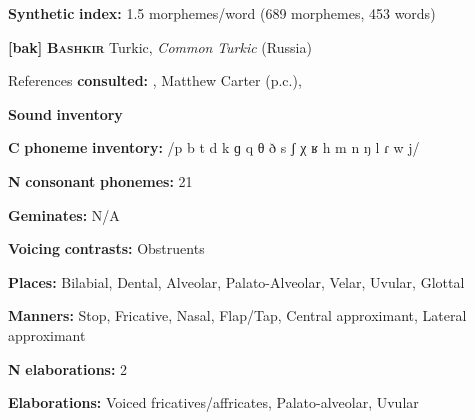 \documentclass[output=paper]{langsci/langscibook}
\begin{document}
\begin{styleBody}
\textbf{Synthetic} \textbf{index:} 1.5 morphemes/word (689 morphemes, 453 words)
\end{styleBody}

\begin{styleBody}
\textbf{[bak]}   \textbf{\textsc{Bashkir}}  Turkic, \textit{Common} \textit{Turkic} (Russia)
\end{styleBody}

\begin{styleBody}
References \textbf{consulted:} \citet{BerksonEtAl2016}, Matthew Carter (p.c.), \citet{Poppe1964}
\end{styleBody}

\begin{styleBody}
\textbf{Sound} \textbf{inventory}
\end{styleBody}

\begin{styleBody}
\textbf{C} \textbf{phoneme} \textbf{inventory:} /p b t d k ɡ q θ ð s ʃ χ ʁ h m n ŋ l ɾ w j/
\end{styleBody}

\begin{styleBody}
\textbf{N} \textbf{consonant} \textbf{phonemes:} 21
\end{styleBody}

\begin{styleBody}
\textbf{Geminates:} N/A
\end{styleBody}

\begin{styleBody}
\textbf{Voicing} \textbf{contrasts:} Obstruents
\end{styleBody}

\begin{styleBody}
\textbf{Places:} Bilabial, Dental, Alveolar, Palato-Alveolar, Velar, Uvular, Glottal
\end{styleBody}

\begin{styleBody}
\textbf{Manners:} Stop, Fricative, Nasal, Flap/Tap, Central approximant, Lateral approximant
\end{styleBody}

\begin{styleBody}
\textbf{N} \textbf{elaborations:} 2
\end{styleBody}

\begin{styleBody}
\textbf{Elaborations:} Voiced fricatives/affricates, Palato-alveolar, Uvular
\end{styleBody}
\end{document}
